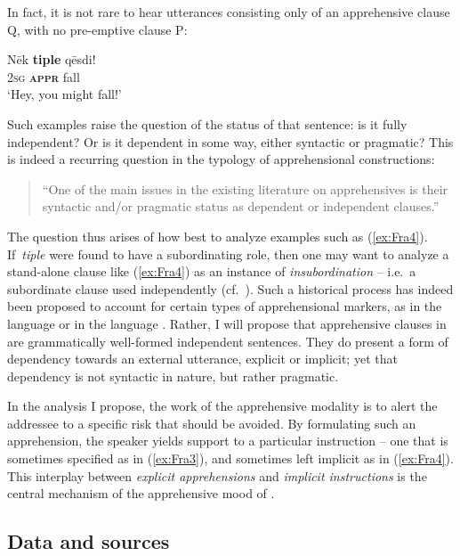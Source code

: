 \documentclass[output=paper,colorlinks,citecolor=brown]{langscibook}
\begin{document}
In fact, it is not rare to hear utterances consisting only of an apprehensive clause Q, with no pre-emptive clause P:
 
\ea \label{ex:Fra4}
\gll Nēk \textbf{tiple} qēsdi! \\
\textsc{2sg} \textsc{\textbf{appr}} fall \\
 `Hey, you might fall!'
\z

 Such examples raise the question of the status of that sentence: is it fully independent? Or is it dependent in some way, either syntactic or pragmatic? This is indeed a recurring question in the typology of apprehensional constructions:

\begin{quote}
    ``One of the main issues in the existing literature on apprehensives is their syntactic and/or pragmatic status as dependent or independent clauses.'' \citep[428]{smithdennis2021}
\end{quote}

The question thus arises of how best to analyze examples such as (\ref{ex:Fra4}). If~\textit{tiple} were found to have a subordinating role, then one may want to analyze a stand-alone clause like (\ref{ex:Fra4}) as an instance of \textit{insubordination} -- i.e.\ a subordinate clause used independently (cf.\ \citealt{evans_insubordination_2007}). Such a historical process has indeed been proposed to account for certain types of apprehensional markers, as in the  language  \citep{smithdennis2021} or in the  language  \citep{chapters/daniel}. Rather, I will propose that apprehensive clauses in  are grammatically well-formed independent sentences. They do present a form of dependency towards an external utterance, explicit or implicit; yet that dependency is not syntactic in nature, but rather pragmatic.

In the analysis I propose, the work of the apprehensive modality is to alert the addressee to a specific risk that should be avoided. By formulating such an apprehension, the speaker yields support to a particular instruction -- one that is sometimes specified as in (\ref{ex:Fra3}), and sometimes left implicit as in (\ref{ex:Fra4}). This interplay between \textit{explicit apprehensions} and \textit{implicit instructions} is the central mechanism of the apprehensive mood of .



\subsection{Data and sources}
\label{subsec:dataandsources}
\end{document}

